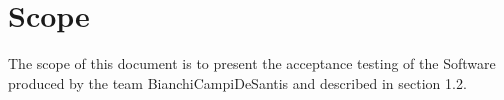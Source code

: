 \section{Scope}
The scope of this document is to present the acceptance testing of the Software produced by the team BianchiCampiDeSantis and described in section 1.2. 